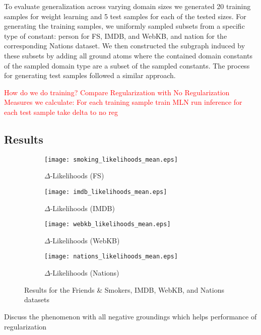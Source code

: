 To evaluate generalization across varying domain sizes we generated 20 training samples for weight learning and 5 test samples for each of the tested sizes. For generating the training samples, we uniformly sampled subsets from a specific type of constant: person for FS, IMDB, and WebKB, and nation for the corresponding Nations dataset. We then constructed the subgraph induced by these subsets by adding all ground atoms where the contained domain constants of the sampled domain type are a subset of the sampled constants. The process for generating test samples followed a similar approach.


\textcolor{red}{How do we do training?}
\textcolor{red}{Compare Regularization with No Regularization}
\textcolor{red}{Measures we calculate: For each training sample train MLN run inference for each test sample take delta to no reg}

\subsection{Results}

\begin{figure}
     \centering
     \begin{subfigure}[b]{0.49\textwidth}
         \centering
         \texttt{[image: smoking\_likelihoods\_mean.eps]}
         \caption{$\Delta$-Likelihoods (FS)}
         \label{Likelihoods (FS)}
     \end{subfigure}
     \hfill
     \begin{subfigure}[b]{0.49\textwidth}
         \centering
         \texttt{[image: imdb\_likelihoods\_mean.eps]}
         \caption{$\Delta$-Likelihoods (IMDB)}
         \label{Likelihoods (IMDB)}
     \end{subfigure}
     \hfill
     \begin{subfigure}[b]{0.49\textwidth}
         \centering
         \texttt{[image: webkb\_likelihoods\_mean.eps]}
         \caption{$\Delta$-Likelihoods (WebKB)}
         \label{Likelihoods (WebKB)}
     \end{subfigure}
     \begin{subfigure}[b]{0.49\textwidth}
         \centering
         \texttt{[image: nations\_likelihoods\_mean.eps]}
         \caption{$\Delta$-Likelihoods (Nations)}
         \label{Likelihoods (Nations)}
     \end{subfigure}
        \caption{Results for the Friends \& Smokers, IMDB, WebKB, and Nations datasets}
        \label{fig:three graphs}
\end{figure}

Discuss the phenomenon with all negative groundings which helps performance of regularization

